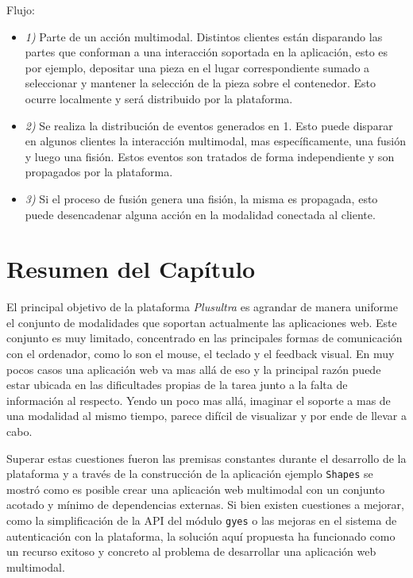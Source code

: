 Flujo:
\begin{itemize}

\item \emph{1)} Parte de un acción multimodal. Distintos clientes están disparando las partes que conforman a una interacción soportada en la aplicación, esto es por ejemplo, depositar una pieza en el lugar correspondiente sumado a seleccionar y mantener la selección de la pieza sobre el contenedor. Esto ocurre localmente y será distribuido por la plataforma.

\item \emph{2)} Se realiza la distribución de eventos generados en 1. Esto puede disparar en algunos clientes la interacción multimodal, mas específicamente, una fusión y luego una fisión. Estos eventos son tratados de forma independiente y son propagados por la plataforma. 

\item \emph{3)} Si el proceso de fusión genera una fisión, la misma es propagada, esto puede desencadenar alguna acción en la modalidad conectada al cliente.

\end{itemize}

\section{Resumen del Capítulo}
El principal objetivo de la plataforma \emph{Plusultra} es agrandar de manera uniforme el conjunto de modalidades que soportan actualmente las aplicaciones web. Este conjunto  es muy limitado, concentrado en las principales formas de comunicación con el ordenador, como lo son el mouse, el teclado y el feedback visual. En muy pocos casos una aplicación web va mas allá de eso y la principal razón puede estar ubicada en las dificultades propias de la tarea junto a la falta de información al respecto. Yendo un poco mas allá, imaginar el soporte a mas de una modalidad al mismo tiempo, parece difícil de visualizar y por ende de llevar a cabo.

Superar estas cuestiones fueron las premisas constantes durante el desarrollo de la plataforma y a través de la construcción de la aplicación ejemplo \texttt{Shapes} se mostró como es posible crear una aplicación web multimodal con un conjunto acotado y mínimo de  dependencias externas. Si bien existen cuestiones a mejorar, como la simplificación de la API del módulo \texttt{gyes} o las mejoras en el sistema de autenticación con la plataforma, la solución aquí propuesta ha funcionado como un recurso exitoso y concreto al problema de desarrollar una aplicación web multimodal.